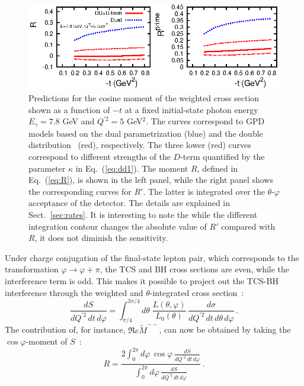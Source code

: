 \begin{figure}[t]
\begin{center}
\includegraphics[scale=1.5]{R_DD_2012_E78.eps}
\end{center}
\caption{\small{
Predictions for the cosine moment of the weighted cross section shown as a
function of $-t$ at a fixed initial-state photon energy $E_\gamma = 7.8$ GeV
and $Q^{\prime 2} = 5$ GeV$^2$. 
The curves correspond to GPD models based on the dual parametrization
\cite{Polyakov:2002wz,Guzey:2006xi,Guzey:2008ys,Polyakov:2008aa} (blue)
and the double distribution~\cite{Radyushkin:1998es} (red), respectively.
The three lower (red) curves correspond to different strengths of the
$D$-term quantified by the parameter $\kappa$ in Eq.~(\ref{eq:dd1}).
The moment $R$, defined in Eq.~(\ref{eq:R}), is shown in the left panel,
while the right panel shows the corresponding curves for $R'$. The latter
is integrated over the $\theta$-$\varphi$ acceptance of the detector.
The details are explained in Sect.~\ref{sec:rates}. It is interesting to
note the while the different integration contour changes the absolute value of
$R'$ compared with $R$, it does not diminish the sensitivity.}}
\label{fig:r_theory}
\end{figure}

Under charge conjugation of the final-state lepton pair, which corresponds to
the transformation $\varphi \to \varphi + \pi$, the TCS and BH cross sections
are even, while the interference term is odd. This makes it possible to
project out the TCS-BH interference through the weighted and
$\theta$-integrated cross
section~\cite{Berger:2001xd}:
\begin{equation}
 \frac{dS}{dQ^{\prime 2}\, dt\, d\varphi} = 
  \int_{\pi/4}^{3\pi/4} d\theta\;
  \frac{L(\theta,\varphi)}{L_0(\theta)}\,
  \frac{d\sigma}{dQ^{\prime 2}\, dt\, d\theta\,d\varphi} \,.
\label{eq:S}
\end{equation}
The contribution of, for instance, $\Re e\tilde{M}^{--}$, can now be obtained
by taking the $\cos \varphi$-moment of $S$~\cite{Berger:2001xd}:
\begin{equation}
 R = \frac{\displaystyle 2 \int_0^{2\pi} d\varphi\, \cos\varphi\, \frac{dS}{dQ^{\prime 2}\, dt\, d\varphi}}
          {\displaystyle \int_0^{2\pi} d\varphi\, \frac{dS}{dQ^{\prime 2}\, dt\, d\varphi}} \,.
\label{eq:R}
\end{equation}

